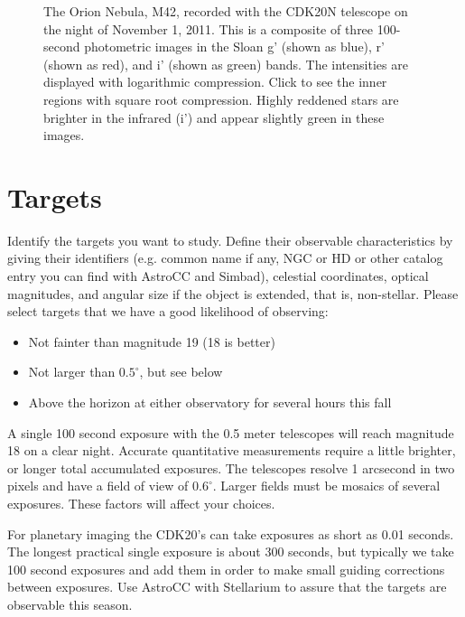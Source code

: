 \documentclass[dvips,12pt]{article}
\begin{document}
\begin{figure}
\begin{center}
\end{center}

\caption{The Orion Nebula, M42, recorded with the CDK20N telescope on the night
of November 1, 2011. This is a composite of three 100-second photometric images
in the Sloan g' (shown as blue), r' (shown as red), and i' (shown as green)
bands. The intensities are displayed with logarithmic compression. Click to see
the inner regions with square root compression. Highly reddened stars are
brighter in the infrared (i') and appear slightly green in these images.
\label{m42}}

\end{figure}


\section{Targets}

Identify the targets you want to study.  Define their observable characteristics
by giving their identifiers (e.g. common name if any, NGC or HD or other catalog
entry you can find with AstroCC and Simbad), celestial coordinates, optical
magnitudes, and angular size if the object is extended, that is, non-stellar.
Please select targets that we have a good likelihood of observing:
\begin{itemize}
\item Not fainter than magnitude 19 (18 is better)
\item Not larger than $0.5^\circ$, but see below
\item Above the horizon at either observatory for several hours this fall
\end{itemize}

A single 100 second exposure with the 0.5 meter telescopes will reach magnitude
18 on a clear night.  Accurate quantitative measurements require a little
brighter, or longer total accumulated exposures.  The telescopes resolve 1
arcsecond in two pixels and have a field of view of $0.6^\circ$.  Larger fields
must be mosaics of several exposures. These factors will affect your
choices.

For planetary imaging the CDK20's can take exposures as short as 0.01 seconds.
The longest practical single exposure is about 300 seconds, but typically we
take 100 second exposures and add them in order to make small guiding
corrections between exposures. Use AstroCC with Stellarium to assure that the
targets are observable this season.
\end{document}

